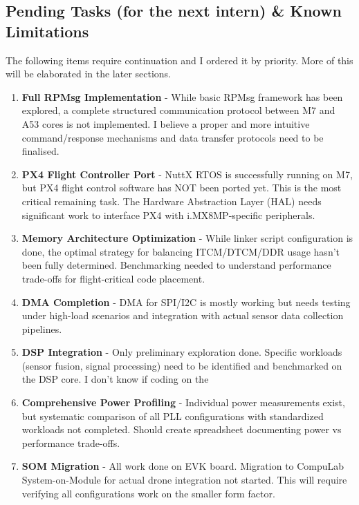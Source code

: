\documentclass[12pt,a4paper]{report}
\begin{document}
\pagebreak


\subsection{Pending Tasks (for the next intern) \& Known Limitations}
\begin{important}
The following items require continuation and I ordered it by priority.
More of this will be elaborated in the later sections.
\end{important}

\begin{enumerate}
    \item \textbf{Full RPMsg Implementation} - While basic RPMsg framework has been explored, a complete structured communication protocol between M7 and A53 cores is not implemented. I believe a proper and more intuitive command/response mechanisms and data transfer protocols need to be finalised.

    \item \textbf{PX4 Flight Controller Port}  - NuttX RTOS is successfully running on M7, but PX4 flight control software has NOT been ported yet. This is the most critical remaining task. The Hardware Abstraction Layer (HAL) needs significant work to interface PX4 with i.MX8MP-specific peripherals.
    
    \item \textbf{Memory Architecture Optimization} - While linker script configuration is done, the optimal strategy for balancing ITCM/DTCM/DDR usage hasn't been fully determined. Benchmarking needed to understand performance trade-offs for flight-critical code placement.
    
    \item \textbf{DMA Completion} - DMA for SPI/I2C is mostly working but needs testing under high-load scenarios and integration with actual sensor data collection pipelines.
    
    \item \textbf{DSP Integration} - Only preliminary exploration done. Specific workloads (sensor fusion, signal processing) need to be identified and benchmarked on the DSP core. I don't know if coding on the 
    
    
    
    \item \textbf{Comprehensive Power Profiling} - Individual power measurements exist, but systematic comparison of all PLL configurations with standardized workloads not completed. Should create spreadsheet documenting power vs performance trade-offs.

    \item \textbf{SOM Migration} - All work done on EVK board. Migration to CompuLab System-on-Module for actual drone integration not started. This will require verifying all configurations work on the smaller form factor.
\end{enumerate}
\end{document}
